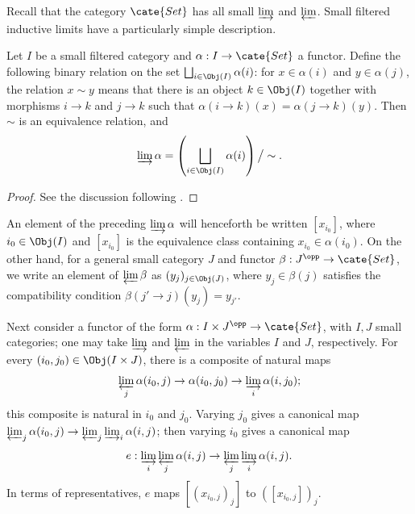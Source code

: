 Recall that the category $\cate{Set}$ has all small $\varinjlim$ and
$\varprojlim$. Small filtered inductive limits have a particularly simple
description.

\begin{proposition}\label{prop:filtered-union}
	Let $I$ be a small filtered category and
	$\alpha: I \to \cate{Set}$ a functor. Define the following binary relation
	on the set $\bigsqcup_{i \in \Obj(I)} \alpha(i)$: for $x \in \alpha(i)$ and
	$y \in \alpha(j)$, the relation $x \sim y$ means that there is an object
	$k\in\Obj(I)$ together with morphisms $i\rightarrow k$ and $j\rightarrow k$ such that
	$\alpha(i \to k)(x) = \alpha(j \to k)(y)$. Then $\sim$ is an equivalence
	relation, and
	\[ \varinjlim \alpha = \left( \bigsqcup_{i \in \Obj(I)} \alpha(i) \right) \big/ \sim . \]
\end{proposition}
\begin{proof}
	See the discussion following \cite[Definition 2.7.6]{Li1}.
\end{proof}

An element of the preceding $\varinjlim \alpha$ will henceforth be written
$[x_{i_0}]$, where $i_0 \in \Obj(I)$ and $[x_{i_0}]$ is the equivalence class
containing $x_{i_0} \in \alpha(i_0)$. On the other hand, for a general small
category $J$ and functor $\beta: J^{\opp} \to \cate{Set}$, we write an
element of $\varprojlim \beta$ as $(y_j)_{j \in \Obj(J)}$, where
$y_j \in \beta(j)$ satisfies the compatibility condition
$\beta(j' \to j)(y_j) = y_{j'}$.

Next consider a functor of the form
$\alpha: I \times J^{\opp} \to \cate{Set}$, with $I, J$ small categories;
one may take $\varinjlim$ and $\varprojlim$ in the variables $I$ and $J$,
respectively. For every $(i_0, j_0) \in \Obj(I \times J)$, there is a
composite of natural maps
\[ \varprojlim_j \alpha(i_0, j) \to \alpha(i_0, j_0) \to \varinjlim_i \alpha(i, j_0); \]
this composite is natural in $i_0$ and $j_0$. Varying $j_0$ gives a canonical
map $\varprojlim_j \alpha(i_0, j) \to
\varprojlim_j \varinjlim_i \alpha(i, j)$; then varying $i_0$ gives a
canonical map
\begin{equation}\label{eqn:filtered-finite-exchange}
	e: \varinjlim_i \varprojlim_j \alpha(i, j) \to \varprojlim_j \varinjlim_i \alpha(i, j).
\end{equation}
In terms of representatives, $e$ maps $\left[ (x_{i_0, j})_j \right]$ to
$\left( [ x_{i_0, j}] \right)_j$.


